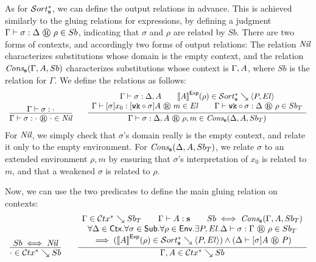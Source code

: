 As for $\glusort$, we can define the output relations in advance.
This is achieved similarly to the gluing relations for expressions, by defining a judgment $\glusubjudg \Gamma \sigma \Delta \rho {Sb}$, indicating that $\sigma$ and $\rho$ are related by $Sb$.  
There are two forms of contexts, and accordingly two forms of output relations:
The relation ${\normalfont\textit{Nil}}$ characterizes substitutions whose domain is the empty context,
  and the relation $\glucons \Gamma A {Sb}$ characterizes substitutions whose context is $\Gamma, A$, where $Sb$ is the relation for $\Gamma$.
We define the relations as follows:
\[
\begin{array}{c}
  \infer{
    \glusubjudg \Gamma \sigma \ctxempty \denvempty \glunil
  }{
    \wfsub \Gamma \sigma \ctxempty
  }
  \qquad
  \infer{
    \glusubjudg \Gamma \sigma {\ctxext \Delta A} {\denvext \rho m} {\glucons \Delta A {Sb_T}}
  }{
    \begin{array}{c}
      \wfsub \Gamma \sigma {\ctxext \Delta A}
      \qquad
      \glusortrel {\evalexpfunc A \rho} P {El}
      \\
      \glutmjudg \Gamma {\tmclo \sigma {x_0}} {\tmclo {\subclo \subwk \sigma} A} m {El}
      \qquad
      \glusubjudg \Gamma {\subclo \subwk \sigma} \Delta \rho {Sb_T}
    \end{array}
  }
\end{array}
\]
For ${\normalfont\textit{Nil}}$, we simply check that $\sigma$'s domain really is the empty context, and relate it only to the empty environment.
For $\glucons \Delta A {Sb_T}$, we relate $\sigma$ to an extended environment $\rho, m$ by ensuring that $\sigma$'s interpretation of $x_0$ is related to $m$,
  and that a weakened $\sigma$ is related to $\rho$.

Now, we can use the two predicates to define the main gluing relation on contexts:
\[
\begin{array}{c}
  \infer{
    \gluctxrel \ctxempty {Sb}
  }{
    Sb \iff \glunil
  }
  \qquad
  \infer{
    \gluctxrel {\ctxext \Gamma A} {Sb}
  }{
    \begin{array}{c}
      \gluctxrel \Gamma {Sb_T}
      \qquad
      \wfexp \Gamma A {\tmcst s}
      \qquad
      Sb \iff \glucons \Gamma A {Sb_T}
      \\
      \forall \Delta \in \Ctx. \forall \sigma \in \Sub. \forall \rho \in \Env. \exists P, El. \glusubjudg \Delta \sigma \Gamma \rho {Sb_T}
      \\
      \implies (\glusortrel {\evalexpfunc A \rho} P {El}) \land (\glutpjudg \Delta {\tmclo \sigma A} P)
    \end{array}
  }
\end{array}
\]


